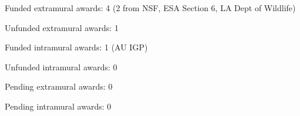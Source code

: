 \begin{veryTightItemize}
    \item Funded extramural awards: 4 (2 from NSF, ESA Section 6, LA Dept of Wildlife)
    \item Unfunded extramural awards: 1
    \item Funded intramural awards: 1 (AU IGP)
    \item Unfunded intramural awards: 0
    \item Pending extramural awards: 0
    \item Pending intramural awards: 0
\end{veryTightItemize}
